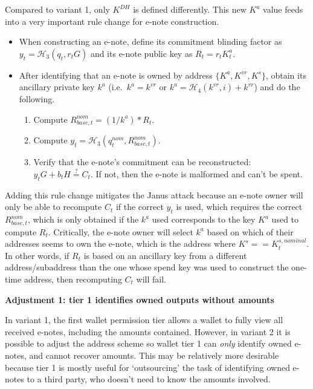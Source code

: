 Compared to variant 1, only $K^{DH}$ is defined differently. This new $K^a$ value feeds into a very important rule change for e-note construction.

\begin{itemize}
    \item When constructing an e-note, define its commitment blinding factor as $y_t = \mathcal{H}_3(q_t, r_t G)$ and its e-note public key as $R_t = r_t K^a_t$.

    \item After identifying that an e-note is owned by address $\{K^a, K^{vr}, K^s\}$, obtain its ancillary private key $k^a$ (i.e.\ $k^a = k^{vr}$ or $k^a = \mathcal{H}_4(k^{vr},i) + k^{vr}$) and do the following.
    \begin{enumerate}
        \item Compute $R^{nom}_{base,t} = (1/k^a)*R_t$.
        \item Compute $y_t = \mathcal{H}_3(q^{nom}_t, R^{nom}_{base,t})$.
        \item Verify that the e-note's commitment can be reconstructed: $y_t G + b_t H \stackrel{?}{=} C_t$. If not, then the e-note is malformed and can't be spent.
    \end{enumerate}
\end{itemize}

Adding this rule change mitigates the Janus attack because an e-note owner will only be able to recompute $C_t$ if the correct $y_t$ is used, which requires the correct $R^{nom}_{base,t}$, which is only obtained if the $k^a$ used corresponds to the key $K^a$ used to compute $R_t$. Critically, the e-note owner will select $k^a$ based on which of their addresses seems to own the e-note, which is the address where $K^s == K^{s,nominal}_t$. In other words, if $R_t$ is based on an ancillary key from a different address/subaddress than the one whose spend key was used to construct the one-time address, then recomputing $C_t$ will fail.

\textbf{Adjustment 1: tier 1 identifies owned outputs without amounts}

In variant 1, the first wallet permission tier allows a wallet to fully view all received e-notes, including the amounts contained. However, in variant 2 it is possible to adjust the address scheme so wallet tier 1 can {\em only} identify owned e-notes, and cannot recover amounts. This may be relatively more desirable because tier 1 is mostly useful for `outsourcing' the task of identifying owned e-notes to a third party, who doesn't need to know the amounts involved.


